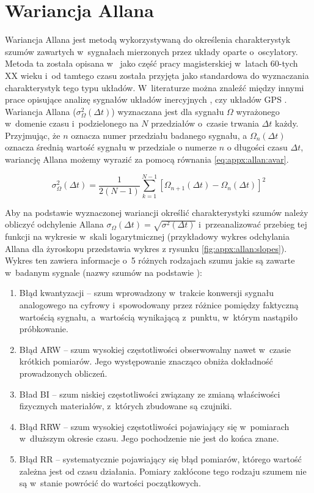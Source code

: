 \chapter{Wariancja Allana}\label{chap:appx:allan}
Wariancja Allana jest metodą wykorzystywaną do określenia charakterystyk szumów zawartych w~sygnałach mierzonych przez układy oparte o~oscylatory. Metoda ta została opisana w~\cite{Allan1966} jako część pracy magisterskiej w~latach 60-tych XX wieku i~od tamtego czasu została przyjęta jako standardowa do wyznaczania charakterystyk tego typu układów. W~literaturze można znaleźć między innymi prace opisujące analizę sygnałów układów inercyjnych \cite{El-Sheimy2008, FreescaleSemiconductor2015}, czy układów GPS \cite{Wright2007}. 
Wariancja Allana ($\sigma_{\Omega}^2(\Delta t)$) wyznaczana jest dla sygnału $\Omega$ wyrażonego w~domenie czasu i~podzielonego na $N$ przedziałów o~czasie trwania $\Delta t$ każdy. Przyjmując, że $n$ oznacza numer przedziału badanego sygnału, a $\Omega_n(\Delta t)$ oznacza średnią wartość sygnału w przedziale o numerze $n$ o długości czasu $\Delta t$, wariancję Allana możemy wyrazić za pomocą równania \ref{eq:appx:allan:avar}\cite{Sochocka2004,Allan1987}.

\begin{equation}
	\label{eq:appx:allan:avar}
	\sigma_{\Omega}^2(\Delta t) = \frac{1}{2(N-1)}\sum_{k=1}^{N-1}[\Omega_{n+1}(\Delta t)-\Omega_n(\Delta t)]^2
\end{equation}

		
Aby na podstawie wyznaczonej wariancji określić charakterystyki szumów należy obliczyć odchylenie Allana $\sigma_{\Omega}(\Delta t) = \sqrt{\sigma^2(\Delta t)}$ i~przeanalizować przebieg tej funkcji na wykresie w~skali logarytmicznej (przykładowy wykres odchylania Allana dla żyroskopu przedstawia wykres z rysunku \ref{fig:appx:allan:slopes}). Wykres ten zawiera informacje o~5 różnych rodzajach szumu jakie są zawarte w~badanym sygnale (nazwy szumów na podstawie \cite{PASZEK2016}):
		
\begin{enumerate}
	\item {Błąd kwantyzacji -- szum wprowadzony w~trakcie konwersji sygnału analogowego na cyfrowy i~spowodowany przez różnice pomiędzy faktyczną wartością sygnału, a~wartością wynikającą z~punktu, w~którym nastąpiło próbkowanie.}
	\item {Błąd ARW -- szum wysokiej częstotliwości obserwowalny nawet w~czasie krótkich pomiarów. Jego występowanie znacząco obniża dokładność prowadzonych obliczeń.}
	\item {Bład BI -- szum niskiej częstotliwości związany ze zmianą właściwości fizycznych materiałów, z~których zbudowane są czujniki.}
	\item {Błąd RRW -- szum wysokiej częstotliwości pojawiający się w~pomiarach w~dłuższym okresie czasu. Jego pochodzenie nie jest do końca znane.}
	\item {Błąd RR -- systematycznie pojawiający się błąd pomiarów, którego wartość zależna jest od czasu działania. Pomiary zakłócone tego rodzaju szumem nie są w~stanie powrócić do wartości początkowych.}	
\end{enumerate}
		
